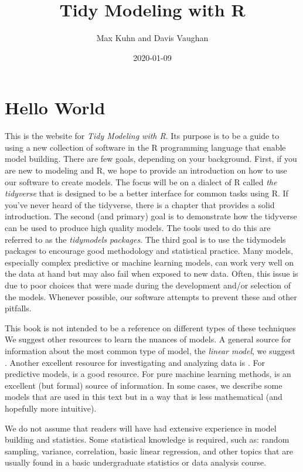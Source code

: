 \documentclass[11pt]{book}
\title{Tidy Modeling with R}
\author{Max Kuhn and Davis Vaughan}
\date{2020-01-09}
\begin{document}
\maketitle

{
\hypersetup{linkcolor=}
\setcounter{tocdepth}{1}
\tableofcontents
}
\hypertarget{hello-world}{%
\chapter*{Hello World}\label{hello-world}}

This is the website for \emph{Tidy Modeling with R}. Its purpose is to be a guide to using a new collection of software in the R programming language that enable model building. There are few goals, depending on your background. First, if you are new to modeling and R, we hope to provide an introduction on how to use our software to create models. The focus will be on a dialect of R called \emph{the tidyverse} that is designed to be a better interface for common tasks using R. If you've never heard of the tidyverse, there is a chapter that provides a solid introduction. The second (and primary) goal is to demonstrate how the tidyverse can be used to produce high quality models. The tools used to do this are referred to as the \emph{tidymodels packages}. The third goal is to use the tidymodels packages to encourage good methodology and statistical practice. Many models, especially complex predictive or machine learning models, can work very well on the data at hand but may also fail when exposed to new data. Often, this issue is due to poor choices that were made during the development and/or selection of the models. Whenever possible, our software attempts to prevent these and other pitfalls.

This book is not intended to be a reference on different types of these techniques We suggest other resources to learn the nuances of models. A general source for information about the most common type of model, the \emph{linear model}, we suggest \citet{fox08}. Another excellent resource for investigating and analyzing data is \citet{wickham2016}. For predictive models, \citet{apm} is a good resource. For pure machine learning methods, \citet{Goodfellow} is an excellent (but formal) source of information. In some cases, we describe some models that are used in this text but in a way that is less mathematical (and hopefully more intuitive).

We do not assume that readers will have had extensive experience in model building and statistics. Some statistical knowledge is required, such as: random sampling, variance, correlation, basic linear regression, and other topics that are usually found in a basic undergraduate statistics or data analysis course.
\end{document}
